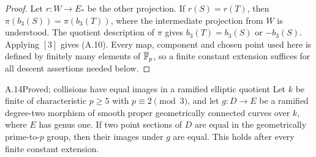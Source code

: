 \begin{proof}
Let $r:W\to E_*$ be the other projection. If $r(S)=r(T)$,
then $\pi(b_3(S))=\pi(b_3(T))$, where the intermediate
projection from $W$ is understood. The quotient description
of $\pi$ gives $b_3(T)=b_3(S)$ or $-b_3(S)$.
Applying $[3]$ gives (A.10). Every map, component and chosen
point used here is defined by finitely many elements of
$\overline{\mathbb F}_p$, so a finite constant extension suffices
for all descent assertions needed below.
\end{proof}

\begin{claim}{A.14}{Proved; collisions have equal images in a ramified elliptic quotient}
Let $k$ be finite of characteristic $p\ge5$ with
$p\equiv2\pmod3$, and let $g:D\to E$ be a ramified degree-two
morphism of smooth proper geometrically connected curves over
$k$, where $E$ has genus one. If two point sections of $D$
are equal in the geometrically prime-to-$p$ group, then their
images under $g$ are equal. This holds after every finite
constant extension.
\end{claim}
